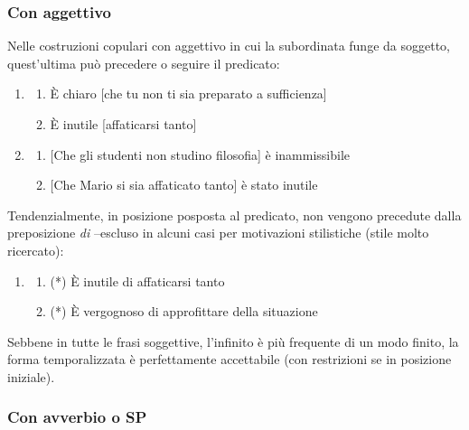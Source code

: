 \documentclass[
  a4paper,
  twoside,
  11pt,
  chapterprefix=false,
  bibliography=totocnumbered,
  listof=flat]{scrbook}
\providecommand{\tightlist}{%
  \setlength{\itemsep}{0pt}\setlength{\parskip}{0pt}}
\begin{document}
\hypertarget{con-aggettivo}{%
\subsubsection{Con aggettivo}\label{con-aggettivo}}

Nelle costruzioni copulari con aggettivo in cui la subordinata funge da soggetto, quest'ultima può precedere o seguire il predicato:

\begin{enumerate}
\def\labelenumi{(\arabic{enumi})}
\setcounter{enumi}{30}
\item
  \begin{enumerate}
  \def\labelenumii{\alph{enumii}.}
  \tightlist
  \item
    È chiaro {[}che tu non ti sia preparato a sufficienza{]}
  \item
    È inutile {[}affaticarsi tanto{]}
  \end{enumerate}
\item
  \begin{enumerate}
  \def\labelenumii{\alph{enumii}.}
  \tightlist
  \item
    {[}Che gli studenti non studino filosofia{]} è inammissibile
  \item
    {[}Che Mario si sia affaticato tanto{]} è stato inutile
  \end{enumerate}
\end{enumerate}

Tendenzialmente, in posizione posposta al predicato, non vengono precedute dalla preposizione \emph{di} --escluso in alcuni casi per motivazioni stilistiche (stile molto ricercato):

\begin{enumerate}
\def\labelenumi{(\arabic{enumi})}
\setcounter{enumi}{32}
\item
  \begin{enumerate}
  \def\labelenumii{\alph{enumii}.}
  \tightlist
  \item
    (*) È inutile di affaticarsi tanto
  \item
    (*) È vergognoso di approfittare della situazione
  \end{enumerate}
\end{enumerate}

Sebbene in tutte le frasi soggettive, l'infinito è più frequente di un modo finito, la forma temporalizzata è perfettamente accettabile (con restrizioni se in posizione iniziale).

\hypertarget{con-avverbio-o-sp}{%
\subsubsection{Con avverbio o SP}\label{con-avverbio-o-sp}}
\end{document}
